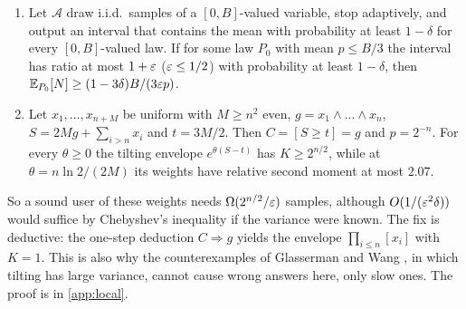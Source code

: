 \begin{proposition}\label{prop:certgap}
\begin{enumerate}[label=(\alph*)]
\item Let $\mathcal A$ draw i.i.d.\ samples of a $[0,B]$-valued variable, stop
adaptively, and output an interval that contains the mean with probability at least
$1-\delta$ for every $[0,B]$-valued law. If for some law $P_0$ with mean $p\le B/3$ the
interval has ratio at most $1+\varepsilon$ ($\varepsilon\le1/2$) with probability at least $1-\delta$, then
$\mathbb{E}_{P_0}[N]\ge(1-3\delta)B/(3\varepsilon p)$.
\item Let $x_1,\dots,x_{n+M}$ be uniform with $M\ge n^2$ even, $g=x_1\wedge\dots\wedge x_n$,
$S=2Mg+\sum_{i>n}x_i$ and $t=3M/2$. Then $C=[S\ge t]=g$ and $p=2^{-n}$. For every
$\theta\ge0$ the tilting envelope $e^{\theta(S-t)}$ has $K\ge2^{n/2}$, while at
$\theta=n\ln2/(2M)$ its weights have relative second moment at most $2.07$.
\end{enumerate}
\end{proposition}

So a sound user of these weights needs $\Omega(2^{n/2}/\varepsilon)$ samples, although
$O(1/(\varepsilon^2\delta))$ would suffice by Chebyshev's inequality if the variance were
known. The fix is deductive: the one-step deduction $C\Rightarrow g$ yields the envelope $\prod_{i\le n}[x_i]$ with $K=1$. This is
also why the counterexamples of Glasserman and Wang \cite{gw1997}, in which tilting has
large variance, cannot cause wrong answers here, only slow ones. The proof is in
\cref{app:local}.

